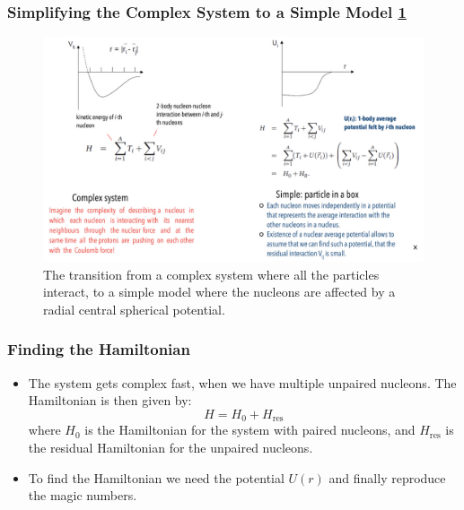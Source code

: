 \subsubsection{Simplifying the Complex System to a Simple Model \cref{fig: central_pot_simplification}}
\begin{figure}[h!]
\centering
\includegraphics[width = .75\textwidth]{central_pot_simplification.png}
\caption{The transition from a complex system where all the particles interact, to a simple model where the nucleons are affected by a radial central spherical potential.}
\label{fig: central_pot_simplification}
\end{figure}


\subsubsection{Finding the Hamiltonian}
\begin{itemize}
    \item The system gets complex fast, when we have multiple unpaired nucleons. The Hamiltonian is then given by:
    \begin{equation}
      H = H_0 + H_{\text{res}}
    \end{equation}
    where $H_0$ is the Hamiltonian for the system with paired nucleons, and $H_{\text{res}}$ is the residual Hamiltonian for the unpaired nucleons. 
    \item To find the Hamiltonian we need the potential $U(r)$ and finally reproduce the magic numbers. 
\end{itemize}